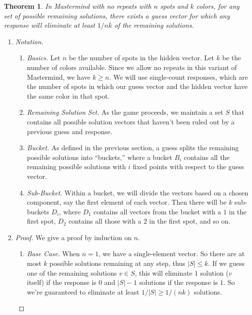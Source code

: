\documentclass[12pt, a4paper]{article}
\newtheorem{theorem}{Theorem}
\begin{document}
\begin{theorem} In Mastermind with no repeats with $n$ spots and $k$ colors,
	for any set of possible remaining solutions, there exists a
	guess vector for which any response will eliminate at least $1/nk$ of the
	remaining solutions.
	\end{theorem}
	\begin{enumerate}
	\item\textit{Notation.}
		\begin{enumerate}[label=\roman*.]
		\item\textit{Basics.} Let $n$ be the number of spots in the hidden vector.
		Let $k$ be the number of colors available. Since we allow no repeats in this
		variant of Mastermind, we have $k\ge n$. We will use single-count responses,
		which are the number of spots in which our guess vector and the hidden vector
		have the same color in that spot.
		\item\textit{Remaining Solution Set.} As the game proceeds, we maintain a set
		$S$ that contains all possible solution vectors that haven't been ruled out
		by a previous guess and response.
		\item\textit{Bucket.} As defined in the previous section, a guess splits
		the remaining possible solutions into ``buckets,'' where a bucket $B_i$
		contains all the remaining possible solutions with $i$ fixed points with
		respect to the guess vector.
		\item\textit{Sub-Bucket.} Within a bucket, we will divide the vectors
		based on a chosen component, say the first element of each vector.
		Then there will be $k$ sub-buckets $D_i$, where $D_1$ contains all vectors
		from the bucket with a $1$ in the first spot, $D_2$ contains all those
		with a $2$ in the first spot, and so on.
		\end{enumerate}

	\item
		\begin{proof}
		We give a proof by induction on $n$.
			\begin{enumerate}[label=]
			\item\textit{Base Case.} When $n=1$, we have a single-element vector.
			So there are at most $k$ possible solutions remaining at any step, thus
			$|S|\le k$. If we guess one of the remaining solutions $v\in S$, this
			will eliminate $1$ solution ($v$ itself) if the response is $0$
			and $|S|-1$ solutions if the response is $1$. So we're guaranteed to
			eliminate at least $1/|S|\ge 1/(nk)$ solutions.
			

\end{enumerate}
\end{proof}
\end{enumerate}
\end{document}
